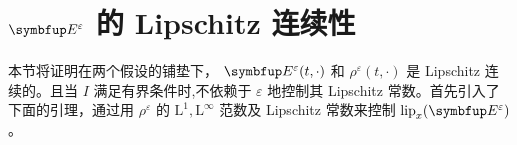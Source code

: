 
    



\section{\texorpdfstring{$\vE^{\varepsilon}$}{Lg} 的 Lipschitz 连续性}

本节将证明在两个假设的铺垫下， $\vE^{\varepsilon}(t, \cdot)$ 和 $\rho^{\varepsilon}(t, \cdot)$ 是 Lipschitz 连续的。且当 $I$ 满足有界条件时,不依赖于 $\varepsilon$ 地控制其 Lipschitz 常数。首先引入了下面的引理，通过用 $\rho^\varepsilon$ 的 $\mathrm{L}^1,\mathrm{L}^\infty$ 范数及 Lipschitz 常数来控制 $\operatorname{lip}_x (\vE^\varepsilon)$。%

